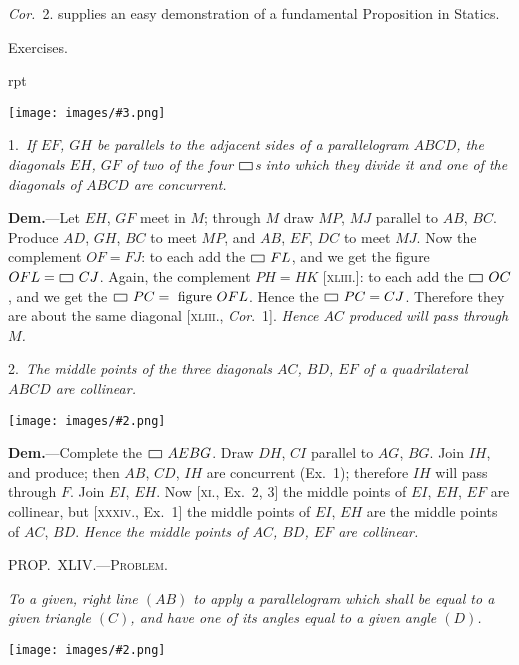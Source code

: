 \documentclass[oneside]{book}
\newcounter{wrapwidth}
\newcommand\pgram{
	\setlength{\unitlength}{1pt}
	\begin{picture}(11,8)(0,0)
	\linethickness{0.5pt}
	\put(1,0){\line(1,0){9}}
	\put(1,0){\line(0,1){5}}
	\put(1,5){\line(1,0){9}}
	\put(10,0){\line(0,1){5}}
	\end{picture}}
\newcommand\mypropl[2]{
\bigskip\Needspace*{4\baselineskip}\begin{center}\textsc{#1}\end{center}
\hspace{\parindent}\emph{#2}\par\medskip
}
\newcommand\exhead[1]{
\Needspace*{5\baselineskip}\begin{center}
\textsf{#1}
\end{center}
}
\newcommand\imgflow[3]{
\setcounter{wrapwidth}{#1}
\begin{wrapfigure}[#2]{r}{\value{wrapwidth}pt}
\begin{center}
\vspace{-0.3in}
\texttt{[image: images/\#3.png]}
\end{center}
\end{wrapfigure}
}
\newcommand\imgcent[2]{
\begin{center}
\texttt{[image: images/\#2.png]}
\end{center}
}
\begin{document}
\begin{footnotesize}
\textit{Cor.}~2. supplies an easy demonstration of a fundamental Proposition
in Statics.
\par\end{footnotesize}


\exhead{Exercises.}

\imgflow{170}{13}{f064}

\begin{footnotesize}
1.~\emph{If $EF$, $GH$ be parallels to the adjacent sides of a parallelogram
$ABCD$, the diagonals
$EH$, $GF$ of two of
the four $\pgram$s into which
they divide it and one of
the diagonals of $ABCD$
are concurrent.}

\textbf{Dem.}---Let $EH$, $GF$
meet in $M$; through $M$
draw $MP$, $MJ$ parallel to
$AB$, $BC$. Produce $AD$,
$GH$, $BC$ to meet $MP$,
and $AB$, $EF$, $DC$ to meet
$MJ$. Now the complement $OF = FJ$: to each add the $\pgram~FL$,
and we get the figure $OFL = \pgram~CJ$. Again, the complement
$PH=HK$ [\textsc{xliii}.]: to each add the $\pgram~OC$, and we get the $\pgram~PC
=\text{\ figure } OFL$. Hence the $\pgram~PC = CJ$. %
Therefore they are
about the same diagonal [\textsc{xliii}., \textit{Cor}.~1]. \emph{Hence $AC$ produced
will pass through $M$.}

2.~\emph{The middle points of the three diagonals $AC$, $BD$, $EF$ of
a quadrilateral $ABCD$ are
collinear.}

\imgcent{158}{f065}

\textbf{Dem.}---Complete the
$\pgram~AEBG$. Draw $DH$, $CI$
parallel to $AG$, $BG$. Join
$IH$, and produce; then $AB$,
$CD$, $IH$ are concurrent
(Ex.~1); therefore $IH$ will
pass through $F$. Join $EI$,
$EH$. Now [\textsc{xi}., Ex.~2, 3]
the middle points of $EI$,
$EH$, $EF$ are collinear, but
[\textsc{xxxiv}., Ex.~1] the middle
points of $EI$, $EH$ are the
middle points of $AC$, $BD$.
\emph{Hence the middle points of $AC$, $BD$, $EF$ are collinear.}
\par\end{footnotesize}


\mypropl{PROP\@.~XLIV\@.---Problem.}{To a given, right line $(AB)$ to apply a parallelogram
which shall be equal to a given triangle $(C)$, and have one
of its angles equal to a given angle $(D)$.}

\imgcent{240}{f066}
\end{document}
